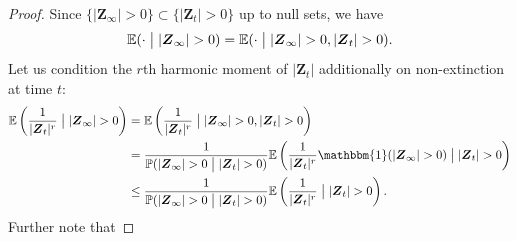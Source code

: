 \documentclass[preprint,3p,12pt]{elsarticle}
\theoremstyle{definition}
\begin{document}
\begin{proof}
Since $\{|\boldsymbol{Z}_{\infty}| >0\} \subset \{|\boldsymbol{Z}_{t}| >0\} $ up to null sets, we have
\begin{equation*}
    \mathbb{E}(\cdot\bigm| |\boldsymbol{Z}_{\infty}| >0) = \mathbb{E}(\cdot\bigm| |\boldsymbol{Z}_{\infty}| >0, |\boldsymbol{Z}_{t}| >0).
\end{equation*}
Let us condition the $r$th harmonic moment of $|\boldsymbol{Z}_t|$ additionally on non-extinction at time $t$:
    \begin{align}
        \mathbb{E}\left(\frac{1}{|\boldsymbol{Z}_t|^r}\bigm| |\boldsymbol{Z}_{\infty}| >0 \right) %
        & = \mathbb{E}\left(\frac{1}{|\boldsymbol{Z}_t|^r}\bigm| |\boldsymbol{Z}_{\infty}| >0, |\boldsymbol{Z}_{t}| >0 \right)\nonumber  \\
        &=  \frac{1}{\mathbb{P}(|\boldsymbol{Z}_{\infty}| > 0 \bigm| |\boldsymbol{Z}_t |>0)}\mathbb{E}\left(\frac{1}{|\boldsymbol{Z}_t|^r} \mathbbm{1}(|\boldsymbol{Z}_{\infty}| >0)\bigm| |\boldsymbol{Z}_{t}| >0 \right)\label{eq:hmequality}  \\
        &\le\frac{1}{\mathbb{P}(|\boldsymbol{Z}_{\infty}| >0\bigm| |\boldsymbol{Z}_{t}| >0 )} \mathbb{E}\left(\frac{1}{|\boldsymbol{Z}_t|^r}\bigm| |\boldsymbol{Z}_{t}| >0 \right). \label{eq:hard_prob}
    \end{align}
Further note that

\end{proof}
\end{document}
